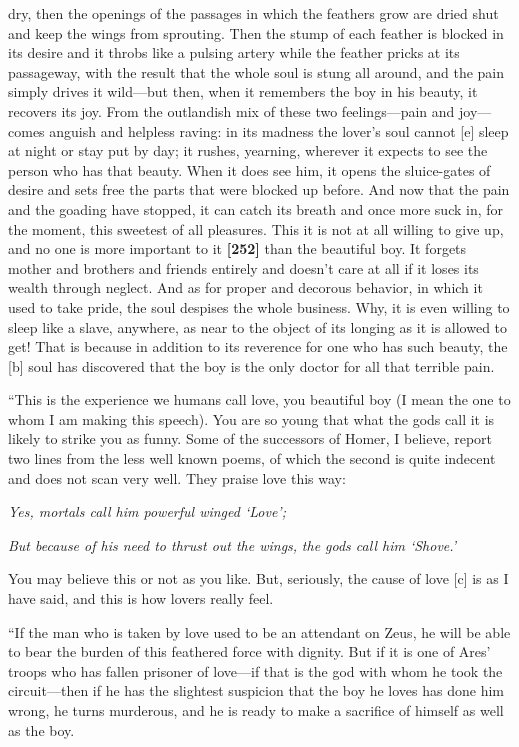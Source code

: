 dry, then the openings of the passages in which the feathers grow are
dried shut and keep the wings from sprouting. Then the stump of each
feather is blocked in its desire and it throbs like a pulsing artery
while the feather pricks at its passageway, with the result that the
whole soul is stung all around, and the pain simply drives it wild---but
then, when it remembers the boy in his beauty, it recovers its joy. From
the outlandish mix of these two feelings---pain and joy---comes anguish
and helpless raving: in its madness the lover's soul cannot {[}e{]}
sleep at night or stay put by day; it rushes, yearning, wherever it
expects to see the person who has that beauty. When it does see him, it
opens the sluice-gates of desire and sets free the parts that were
blocked up before. And now that the pain and the goading have stopped,
it can catch its breath and once more suck in, for the moment, this
sweetest of all pleasures. This it is not at all willing to give up, and
no one is more important to it {\bf {[}252{]}} than the beautiful boy.
It forgets mother and brothers and friends entirely and doesn't care at
all if it loses its wealth through neglect. And as for proper and
decorous behavior, in which it used to take pride, the soul despises the
whole business. Why, it is even willing to sleep like a slave, anywhere,
as near to the object of its longing as it is allowed to get! That is
because in addition to its reverence for one who has such beauty, the
{[}b{]} soul has discovered that the boy is the only doctor for all that
terrible pain.

“This is the experience we humans call love, you beautiful boy (I mean
the one to whom I am making this
speech). You are so
young that what the gods call it is likely to strike you as funny. Some
of the successors of Homer, I believe, report two lines from the less
well known poems, of which the second is quite indecent and does not
scan very well. They praise love this way:\crlf
\crlf

{\em Yes, mortals call him powerful winged ‘Love';}

{\em But because of his need to thrust out the wings,} {\em the gods
call him
‘Shove.'}\crlf
\crlf

You may believe this or not as you like. But, seriously, the cause of
love {[}c{]} is as I have said, and this is how lovers really feel.

“If the man who is taken by love used to be an attendant on Zeus, he
will be able to bear the burden of this feathered force with dignity.
But if it is one of Ares' troops who has fallen prisoner of love---if
that is the god with whom he took the circuit---then if he has the
slightest suspicion that the boy he loves has done him wrong, he turns
murderous, and he is ready to make a sacrifice of himself as well as the
boy.

